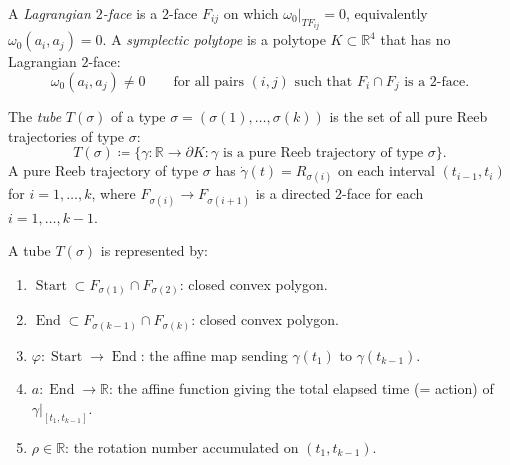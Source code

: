 
\begin{unverified}
\begin{definition}\label{def:symplectic-polytope}
A \emph{Lagrangian $2$-face} is a $2$-face $F_{ij}$ on which
$\omega_0|_{T F_{ij}} = 0$, equivalently $\omega_0(a_i, a_j) = 0$.
A \emph{symplectic polytope} is a polytope $K \subset \mathbb{R}^4$
that has no Lagrangian $2$-face:
\[
  \omega_0(a_i, a_j) \neq 0
  \qquad \text{for all pairs } (i,j)
  \text{ such that } F_i \cap F_j \text{ is a $2$-face.}
\]
\end{definition}
\end{unverified}


\begin{unverified}
\begin{definition}[Tube]\label{def:tube}
The \emph{tube} $T(\sigma)$ of a type $\sigma = (\sigma(1), \ldots, \sigma(k))$
is the set of all pure Reeb trajectories of type $\sigma$:
\[
  T(\sigma) \coloneqq \bigl\{
    \gamma \colon \mathbb{R} \to \partial K
    : \gamma \text{ is a pure Reeb trajectory of type } \sigma
  \bigr\}.
\]
A pure Reeb trajectory of type $\sigma$ has
$\dot{\gamma}(t) = R_{\sigma(i)}$ on each interval
$(t_{i-1}, t_i)$ for $i = 1, \ldots, k$,
where $F_{\sigma(i)} \to F_{\sigma(i+1)}$ is a directed $2$-face
for each $i = 1, \ldots, k-1$.
\end{definition}
\end{unverified}


\begin{unverified}
\begin{definition}\label{def:tube-data}
A tube $T(\sigma)$ is represented by:
\begin{enumerate}
\item $\operatorname{Start} \subset F_{\sigma(1)} \cap F_{\sigma(2)}$:
  closed convex polygon.
\item $\operatorname{End} \subset F_{\sigma(k-1)} \cap F_{\sigma(k)}$:
  closed convex polygon.
\item $\varphi \colon \operatorname{Start} \to \operatorname{End}$:
  the affine map sending $\gamma(t_1)$ to $\gamma(t_{k-1})$.
\item $a \colon \operatorname{End} \to \mathbb{R}$:
  the affine function giving the total elapsed time (= action)
  of $\gamma|_{[t_1, t_{k-1}]}$.
\item $\rho \in \mathbb{R}$:
  the rotation number accumulated on $(t_1, t_{k-1})$.
\end{enumerate}
\end{definition}
\end{unverified}


